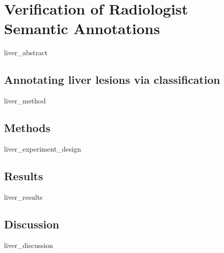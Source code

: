 \chapter{Verification of Radiologist Semantic Annotations}
{liver_abstract}
\clearpage

\section{Annotating liver lesions via classification}
{liver_method}
\clearpage

\section{Methods}
{liver_experiment_design}
\clearpage

\section{Results}
{liver_results}
\clearpage

\section{Discussion}
{liver_discussion}
\clearpage